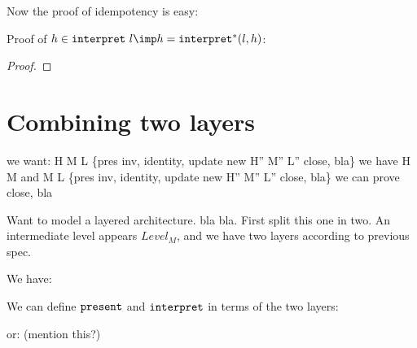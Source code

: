 Now the proof of idempotency is easy:

Proof of $h \in \interpret~l \imp h = \interpret^* (l,h)$:

\begin{proof}
\end{proof}



%																
%																
%																
\section{Combining two layers}

\bl
\* we want: H M L \{pres inv, identity, update \rarr new H'' M'' L'' close, bla\}
\* we have H M and M L  \{pres inv, identity, update \rarr new H'' M'' L'' close, bla\}
\* we can prove close, bla
\el

Want to model a layered architecture. bla bla. First split this one in two. An intermediate level appears $Level_M$, and we have two layers according to previous spec. 

We have: 

We can define ${\tt present}$ and ${\tt interpret}$ in terms of the two layers:


or: (mention this?)


